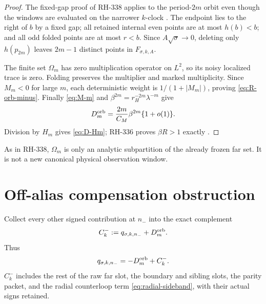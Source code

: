 \documentclass[11pt]{article}
\theoremstyle{remark}
\begin{document}
\begin{proof}
The fixed-gap proof of RH-338 applies to the period-$2m$ orbit even though
the windows are evaluated on the narrower $k$-clock
\citep{WangFarAtom2026}.  The endpoint lies to the right of $b$ by a fixed
gap; all retained internal even points are at most $h(b)<b$; and all odd
folded points are at most $r<b$.  Since $A\sqrt\sigma\to0$, deleting only
$h(p_{2m})$ leaves $2m-1$ distinct points in $F_{\sigma,k,A}$.

The finite set $\Omega_m$ has zero multiplication operator on $L^2$, so its
noisy localized trace is zero.  Folding preserves the multiplier and marked
multiplicity.  Since $M_m<0$ for large $m$, each deterministic weight is
$1/(1+|M_m|)$, proving \eqref{eq:R-orb-minus}.  Finally
\eqref{eq:M-m} and $\beta^{2m}=r_H^{-2m}\lambda^{-m}$ give
\begin{equation*}
 D_m^{\rm orb}=\frac{2m}{C_M}\beta^{2m}\{1+o(1)\}.
\end{equation*}
Division by $H_m$ gives \eqref{eq:D-Hm}; RH-336 proves $\beta R>1$ exactly
\citep{WangProjectorMass2026}.
\end{proof}

As in RH-338, $\Omega_m$ is only an analytic subpartition of the already
frozen far set.  It is not a new canonical physical observation window.

\section{Off-alias compensation obstruction}

Collect every other signed contribution at $n_-$ into the exact complement
\begin{equation}\label{eq:C-minus}
 C_k^-:=q_{\sigma,k,n_-}+D_m^{\rm orb}.
\end{equation}
Thus
\begin{equation}\label{eq:q-minus-split}
 q_{\sigma,k,n_-}=-D_m^{\rm orb}+C_k^-.
\end{equation}
$C_k^-$ includes the rest of the raw far slot, the boundary and sibling
slots, the parity packet, and the radial counterloop term
\eqref{eq:radial-sideband}, with their actual signs retained.
\end{document}
